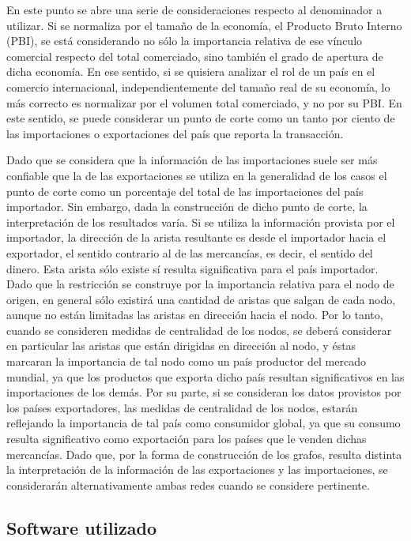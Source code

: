 \documentclass[runningheads,a4paper]{llncs}
\begin{document}
En este punto se abre una serie de consideraciones respecto al denominador a utilizar. Si se normaliza por el tamaño de la economía, el Producto Bruto Interno (PBI), se está considerando no sólo la importancia relativa de ese vínculo comercial respecto del total comerciado, sino también el grado de apertura de dicha economía. En ese sentido, si se quisiera analizar el rol de un país en el comercio internacional, independientemente del tamaño real de su economía, lo más correcto es normalizar por el volumen total comerciado, y no por su PBI. En este sentido, se puede considerar un punto de corte como un tanto por ciento de las importaciones o exportaciones del país que reporta la transacción.

Dado que se considera que la información de las importaciones suele ser más confiable que la de las exportaciones\cite{Fan2014} se utiliza en la generalidad de los casos el punto de corte como un porcentaje del total de las importaciones del país importador. Sin embargo, dada la construcción de dicho punto de corte, la interpretación de los resultados varía. Si se utiliza la información provista por el importador, la dirección de la arista resultante es desde el importador hacia el exportador, el sentido contrario al de las mercancías, es decir, el sentido del dinero. Esta arista sólo existe sí resulta significativa para el país importador. Dado que la restricción se construye por la importancia relativa para el nodo de origen, en general sólo existirá una cantidad de aristas que salgan de cada nodo, aunque no están limitadas las aristas en dirección hacia el nodo. Por lo tanto, cuando se consideren medidas de centralidad de los nodos, se deberá considerar en particular las aristas que están dirigidas en dirección al nodo, y éstas marcaran la importancia de tal nodo como un país productor del mercado mundial, ya que los productos que exporta dicho país resultan significativos en las importaciones de los demás. Por su parte, si se consideran los datos provistos por los países exportadores, las medidas de centralidad de los nodos, estarán reflejando la importancia de tal país como consumidor global, ya que su consumo resulta significativo como exportación para los países que le venden dichas mercancías. 
Dado que, por la forma de construcción de los grafos, resulta distinta la interpretación de la información de las exportaciones y las importaciones, se considerarán alternativamente ambas redes cuando se considere pertinente. 

\subsection{Software utilizado}
\end{document}
